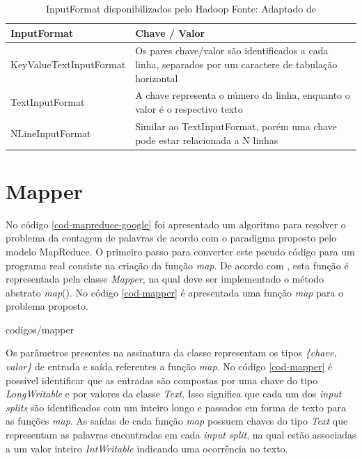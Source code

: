 \begin{table}[!ht]
\begin{center}
  \begin{tabular}{|p{5cm}|p{5cm}|}
	\hline
	InputFormat & Chave / Valor	
	\\ \hline
	KeyValueTextInputFormat & Os pares chave/valor são identificados a cada linha, separados por um caractere de tabulação horizontal
	\\ \hline
	TextInputFormat & A chave representa o número da linha, enquanto o valor é o respectivo texto
	\\ \hline
	NLineInputFormat & Similar ao TextInputFormat, porém uma chave pode estar relacionada a N linhas
	\\ \hline
  \end{tabular}
  \captionsetup{justification=centering}
  \caption[InputFormat disponibilizados pelo Hadoop]{InputFormat disponibilizados pelo Hadoop
  \protect\linebreak Fonte: Adaptado de \cite{venner2009}}
\label{tab-inputformat}
\end{center}
\end{table}
\FloatBarrier

\section{Mapper}

No código \ref{cod-mapreduce-google} foi apresentado um algoritmo para resolver o problema da contagem de palavras de acordo com o paradigma proposto pelo modelo MapReduce. O primeiro passo para converter este pseudo código para um programa real consiste na criação da função \textit{map}. De acordo com , esta função é representada pela classe \textit{Mapper}, na qual deve ser implementado o método abstrato \textit{map}(). No código \ref{cod-mapper} é apresentada uma função \textit{map} para o problema proposto.


		{codigos/mapper}

Os parâmetros presentes na assinatura da classe representam os tipos \textit{\{chave, valor\}} de entrada e saída referentes a função \textit{map}. No código \ref{cod-mapper} é possível identificar que as entradas são compostas por uma chave do tipo \textit{LongWritable} e por valores da classe \textit{Text}. Isso significa que cada um dos \textit{input splits} são identificados com um inteiro longo e passados em forma de texto para as funções \textit{map}. As saídas de cada função \textit{map} possuem chaves do tipo \textit{Text} que representam as palavras encontradas em cada \textit{input split}, na qual estão associadas a um valor inteiro \textit{IntWritable} indicando uma ocorrência no texto.

